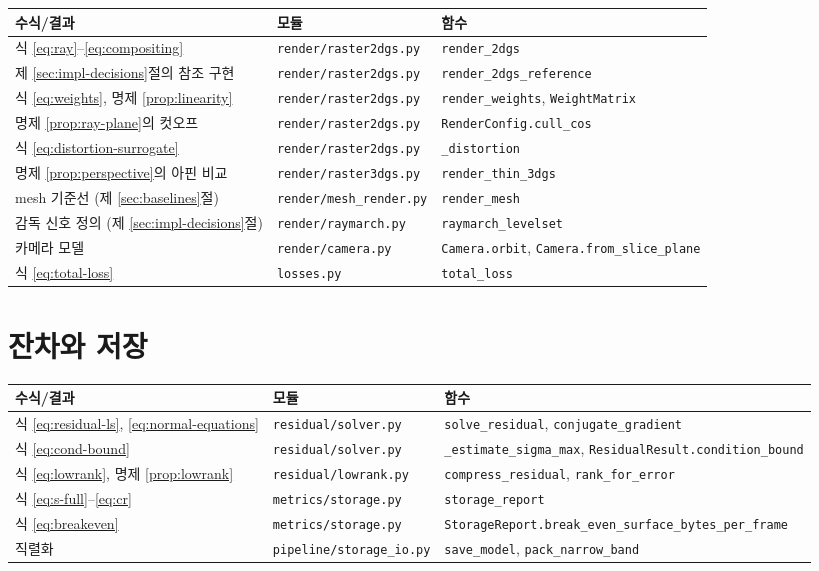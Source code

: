 \begin{longtable}{@{}p{3.6cm}p{4.6cm}p{5.2cm}@{}}
\toprule
수식/결과 & 모듈 & 함수 \\
\midrule
\endhead
식 \eqref{eq:ray}--\eqref{eq:compositing} & \texttt{render/raster2dgs.py} & \texttt{render\_2dgs} \\
제 \ref{sec:impl-decisions}절의 참조 구현 & \texttt{render/raster2dgs.py}
  & \texttt{render\_2dgs\_reference} \\
식 \eqref{eq:weights}, 명제 \ref{prop:linearity} & \texttt{render/raster2dgs.py}
  & \texttt{render\_weights}, \texttt{WeightMatrix} \\
명제 \ref{prop:ray-plane}의 컷오프 & \texttt{render/raster2dgs.py}
  & \texttt{RenderConfig.cull\_cos} \\
식 \eqref{eq:distortion-surrogate} & \texttt{render/raster2dgs.py} & \texttt{\_distortion} \\
명제 \ref{prop:perspective}의 아핀 비교 & \texttt{render/raster3dgs.py} & \texttt{render\_thin\_3dgs} \\
mesh 기준선 (제 \ref{sec:baselines}절) & \texttt{render/mesh\_render.py} & \texttt{render\_mesh} \\
감독 신호 정의 (제 \ref{sec:impl-decisions}절) & \texttt{render/raymarch.py}
  & \texttt{raymarch\_levelset} \\
카메라 모델 & \texttt{render/camera.py}
  & \texttt{Camera.orbit}, \texttt{Camera.from\_slice\_plane} \\
식 \eqref{eq:total-loss} & \texttt{losses.py} & \texttt{total\_loss} \\
\bottomrule
\end{longtable}

\section{잔차와 저장}

\begin{longtable}{@{}p{3.6cm}p{4.6cm}p{5.2cm}@{}}
\toprule
수식/결과 & 모듈 & 함수 \\
\midrule
\endhead
식 \eqref{eq:residual-ls}, \eqref{eq:normal-equations} & \texttt{residual/solver.py}
  & \texttt{solve\_residual}, \texttt{conjugate\_gradient} \\
식 \eqref{eq:cond-bound} & \texttt{residual/solver.py}
  & \texttt{\_estimate\_sigma\_max}, \texttt{ResidualResult.condition\_bound} \\
식 \eqref{eq:lowrank}, 명제 \ref{prop:lowrank} & \texttt{residual/lowrank.py}
  & \texttt{compress\_residual}, \texttt{rank\_for\_error} \\
식 \eqref{eq:s-full}--\eqref{eq:cr} & \texttt{metrics/storage.py} & \texttt{storage\_report} \\
식 \eqref{eq:breakeven} & \texttt{metrics/storage.py}
  & \texttt{StorageReport.break\_even\_surface\_bytes\_per\_frame} \\
직렬화 & \texttt{pipeline/storage\_io.py}
  & \texttt{save\_model}, \texttt{pack\_narrow\_band} \\
\bottomrule
\end{longtable}

